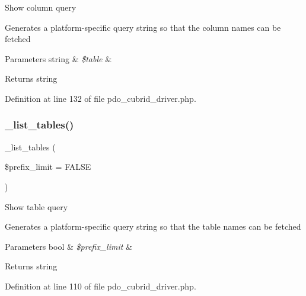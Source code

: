 Show column query

Generates a platform-\/specific query string so that the column names can be fetched


\begin{DoxyParams}[1]{Parameters}
string & {\em \$table} & \\
\hline
\end{DoxyParams}
\begin{DoxyReturn}{Returns}
string 
\end{DoxyReturn}


Definition at line 132 of file pdo\+\_\+cubrid\+\_\+driver.\+php.

\mbox{\label{class_c_i___d_b__pdo__cubrid__driver_a435c0f3ce54fe7daa178baa8532ebd54}} 
\subsubsection{\texorpdfstring{\_list\_tables()}{\_list\_tables()}}
{\footnotesize\ttfamily \+\_\+list\+\_\+tables (\begin{DoxyParamCaption}\item[{}]{\$prefix\+\_\+limit = {\ttfamily FALSE} }\end{DoxyParamCaption})\hspace{0.3cm}{\ttfamily [protected]}}

Show table query

Generates a platform-\/specific query string so that the table names can be fetched


\begin{DoxyParams}[1]{Parameters}
bool & {\em \$prefix\+\_\+limit} & \\
\hline
\end{DoxyParams}
\begin{DoxyReturn}{Returns}
string 
\end{DoxyReturn}


Definition at line 110 of file pdo\+\_\+cubrid\+\_\+driver.\+php.

\mbox{\label{class_c_i___d_b__pdo__cubrid__driver_aa029600528fc1ce660a23ff4b4667f95}} 
